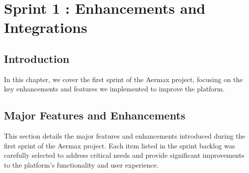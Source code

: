 \chapter{Sprint 1 : Enhancements and Integrations}
\setcounter{secnumdepth}{0}

\section{Introduction}
In this chapter, we cover the first sprint of the Aermax project, focusing on the key enhancements and features we implemented to improve the platform.
\setcounter{secnumdepth}{2} 
\section{Major Features and Enhancements}
This section details the major features and enhancements introduced during the first sprint of the Aermax project. Each item listed in the sprint backlog was carefully selected to address critical needs and provide significant improvements to the platform's functionality and user experience.
